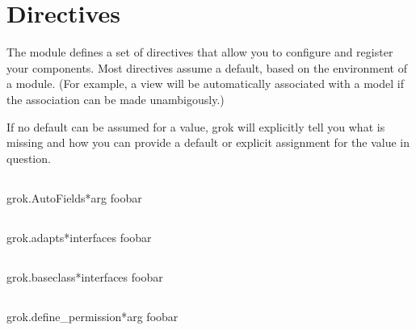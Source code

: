 \chapter{Directives}

The  module defines a set of directives that allow you to
configure and register your components. Most directives assume a default, based
on the environment of a module. (For example, a view will be automatically
associated with a model if the association can be made unambigously.)

If no default can be assumed for a value, grok will explicitly tell you what is
missing and how you can provide a default or explicit assignment for the value
in question.

    \section{}

        \begin{funcdesc}{grok.AutoFields}{*arg}
        foobar
        \end{funcdesc}

    \section{}

        \begin{funcdesc}{grok.adapts}{*interfaces}
        foobar
        \end{funcdesc}

    \section{}

        \begin{funcdesc}{grok.baseclass}{*interfaces}
        foobar
        \end{funcdesc}

    \section{}

        \begin{funcdesc}{grok.define_permission}{*arg}
        foobar
        \end{funcdesc}

    \section{}

